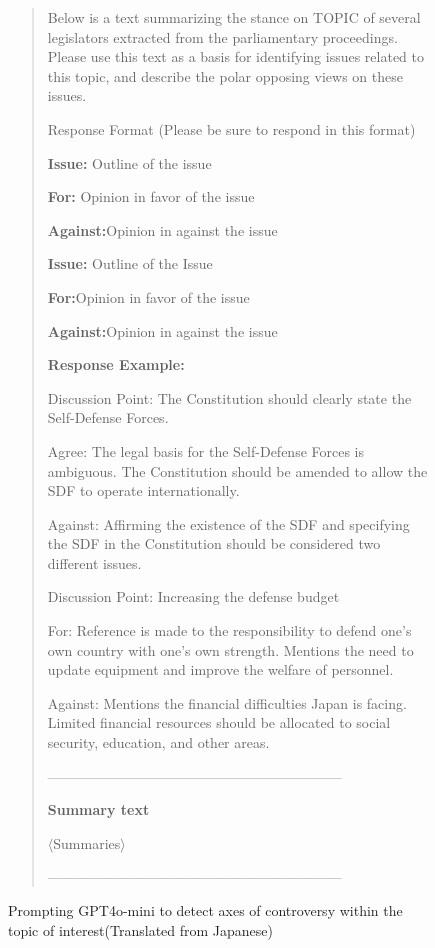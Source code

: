 \documentclass[final,5p,times,twocolumn,authoryear]{elsarticle}
\begin{document}
\begin{figure}[htbp]
    \centering
    \begin{quote}
        Below is a text summarizing the stance on TOPIC of several legislators extracted from the parliamentary proceedings.
        Please use this text as a basis for identifying issues related to this topic, and describe the polar opposing views on these issues.
        
        Response Format (Please be sure to respond in this format) 

        \textbf{Issue:} Outline of the issue
        
        \textbf{For:} Opinion in favor of the issue
       
        \textbf{Against:}Opinion in against the issue
        \newline
        
        \textbf{Issue: }Outline of the Issue
       
        \textbf{For:}Opinion in favor of the issue
        
        \textbf{Against:}Opinion in against the issue
        \newline \newline
        
        \textbf{Response Example:}
        
        Discussion Point: The Constitution should clearly state the Self-Defense Forces.
        
        Agree: The legal basis for the Self-Defense Forces is ambiguous. The Constitution should be amended to allow the SDF to operate internationally.
        
        Against: Affirming the existence of the SDF and specifying the SDF in the Constitution should be considered two different issues.
        \newline 
        \newline
        
        Discussion Point: Increasing the defense budget
        
        For: Reference is made to the responsibility to defend one's own country with one's own strength. Mentions the need to update equipment and improve the welfare of personnel.
        
        Against: Mentions the financial difficulties Japan is facing. Limited financial resources should be allocated to social security, education, and other areas.
        
        
        ---------------------------------------------------------------
        
       \textbf{ Summary text}
       
       
       $\langle$Summaries$\rangle$

       ---------------------------------------------------------------

       
    \end{quote}
    \caption{Prompting GPT4o-mini to detect axes of controversy within the topic of interest(Translated from Japanese)}
    \label{fig:axes detection}
\end{figure}
\end{document}
